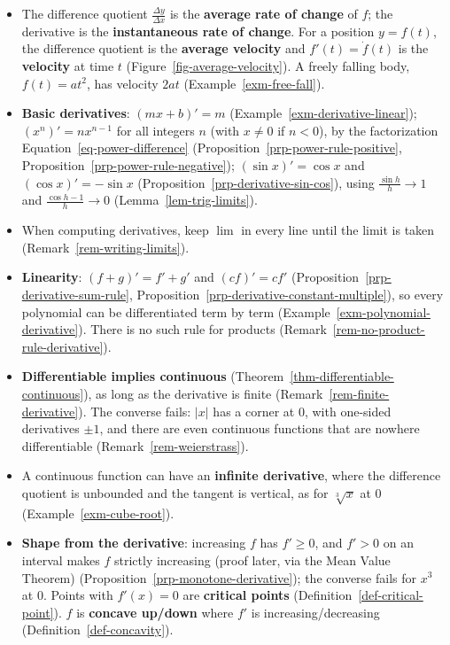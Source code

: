 \documentclass[
  letterpaper,
  DIV=11,
  numbers=noendperiod]{scrreprt}
\theoremstyle{plain}
\theoremstyle{plain}
\theoremstyle{definition}
\theoremstyle{definition}
\theoremstyle{definition}
\theoremstyle{plain}
\theoremstyle{plain}
\theoremstyle{remark}
\begin{document}
\begin{itemize}
\item
  The difference quotient \(\frac{\Delta y}{\Delta x}\) is the
  \textbf{average rate of change} of \(f\); the derivative is the
  \textbf{instantaneous rate of change}. For a position \(y=f(t)\), the
  difference quotient is the \textbf{average velocity} and
  \(f'(t)=\dot f(t)\) is the \textbf{velocity} at time \(t\)
  (Figure~\ref{fig-average-velocity}). A freely falling body,
  \(f(t)=at^2\), has velocity \(2at\) (Example~\ref{exm-free-fall}).
\item
  \textbf{Basic derivatives}: \((mx+b)'=m\)
  (Example~\ref{exm-derivative-linear}); \((x^n)' = nx^{n-1}\) for all
  integers \(n\) (with \(x\neq0\) if \(n<0\)), by the factorization
  Equation~\ref{eq-power-difference}
  (Proposition~\ref{prp-power-rule-positive},
  Proposition~\ref{prp-power-rule-negative}); \((\sin x)'=\cos x\) and
  \((\cos x)'=-\sin x\) (Proposition~\ref{prp-derivative-sin-cos}),
  using \(\frac{\sin h}{h}\to1\) and \(\frac{\cos h-1}{h}\to0\)
  (Lemma~\ref{lem-trig-limits}).
\item
  When computing derivatives, keep \(\lim\) in every line until the
  limit is taken (Remark~\ref{rem-writing-limits}).
\item
  \textbf{Linearity}: \((f+g)'=f'+g'\) and \((cf)'=cf'\)
  (Proposition~\ref{prp-derivative-sum-rule},
  Proposition~\ref{prp-derivative-constant-multiple}), so every
  polynomial can be differentiated term by term
  (Example~\ref{exm-polynomial-derivative}). There is no such rule for
  products (Remark~\ref{rem-no-product-rule-derivative}).
\item
  \textbf{Differentiable implies continuous}
  (Theorem~\ref{thm-differentiable-continuous}), as long as the
  derivative is finite (Remark~\ref{rem-finite-derivative}). The
  converse fails: \(\lvert x \rvert\) has a corner at \(0\), with
  one-sided derivatives \(\pm1\), and there are even continuous
  functions that are nowhere differentiable
  (Remark~\ref{rem-weierstrass}).
\item
  A continuous function can have an \textbf{infinite derivative}, where
  the difference quotient is unbounded and the tangent is vertical, as
  for \(\sqrt[3]{x}\) at \(0\) (Example~\ref{exm-cube-root}).
\item
  \textbf{Shape from the derivative}: increasing \(f\) has \(f'\ge0\),
  and \(f'>0\) on an interval makes \(f\) strictly increasing (proof
  later, via the Mean Value Theorem)
  (Proposition~\ref{prp-monotone-derivative}); the converse fails for
  \(x^3\) at \(0\). Points with \(f'(x)=0\) are \textbf{critical points}
  (Definition~\ref{def-critical-point}). \(f\) is \textbf{concave
  up/down} where \(f'\) is increasing/decreasing
  (Definition~\ref{def-concavity}).
\end{itemize}
\end{document}

